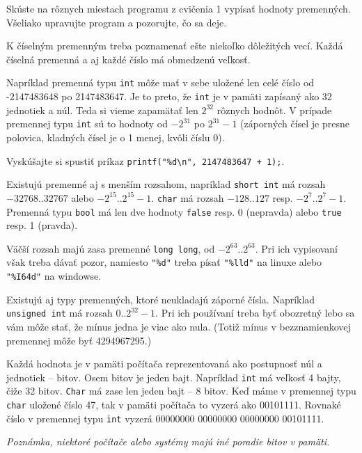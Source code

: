 \cvicenie Skúste na rôznych miestach programu z cvičenia 1 vypísať hodnoty
premenných. Všeliako upravujte program a pozorujte, čo sa deje.
\fakeriesenie


K číselným premenným treba poznamenať ešte niekoľko dôležitých vecí.  Každá
číselná premenná a aj každé číslo má obmedzenú veľkosť.

Napríklad premenná typu \verb!int! môže mať v sebe uložené len celé číslo od
-2147483648 po 2147483647. Je to preto, že \verb!int! je v pamäti zapísaný ako
32 jednotiek a núl. Teda si vieme zapamätať len $2^{32}$ rôznych hodnôt.  V
prípade premennej typu \verb!int! sú to hodnoty od $-2^{31}$ po $2^{31}-1$
(záporných čísel je presne polovica, kladných čísel je o 1 menej, kvôli číslu
0).

\cvicenie Vyskúšajte si spustiť príkaz \verb!printf("%d\n", 2147483647 + 1);!.
\fakeriesenie

\medskip

Existujú premenné aj s menším rozsahom, napríklad \verb!short int! má rozsah
$-32768..32767$ alebo $-2^{15}..2^{15}-1$.  \verb!char! má rozsah $-128..127$
resp. $-2^7..2^7-1$. Premenná typu \verb!bool! má len dve hodnoty 
\verb!false! resp. 0 (nepravda) alebo \verb!true! resp. 1 (pravda).

Väčší rozsah majú zasa premenné \verb!long long!, od $-2^{63}..2^{63}$. Pri ich
vypisovaní však treba dávať pozor, namiesto \verb!"%d"! treba písať
\verb!"%lld"! na linuxe alebo \verb!"%I64d"! na windowse.

Existujú aj typy premenných, ktoré neukladajú záporné čísla. Napríklad
\verb!unsigned int! má rozsah $0..2^{32}-1$.  Pri ich používaní treba byť
obozretný lebo sa vám môže stať, že mínus jedna je viac ako nula.  (Totiž mínus
v bezznamienkovej premennej môže byť 4294967295.)


Každá hodnota je v pamäti počítača reprezentovaná ako postupnosť núl a
jednotiek -- bitov. Osem bitov je jeden bajt. Napríklad \verb!int! má veľkosť 4
bajty, čiže 32 bitov. \verb!Char! má zase len jeden bajt -- 8 bitov. Keď máme v
premennej typu \verb!char! uložené číslo 47, tak v pamäti počítača to vyzerá
ako 00101111. Rovnaké číslo v premennej typu \verb!int! vyzerá 00000000
00000000 00000000 00101111. 

\textit{Poznámka, niektoré počítače alebo systémy majú iné poradie bitov v
pamäti.}

